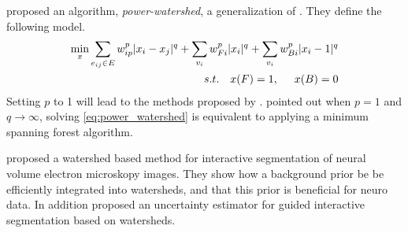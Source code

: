 \citet{couprie_2011_pami} proposed an algorithm, \emph{power-watershed}, a generalization of \citep{RANDOM_WALKER, GRAPH_CUT,WATHERSHEDS,sinop_2007_iccv}.
They define the following model.
\begin{align}\label{eq:power_watershed}
\min_x \sum_{e_{ij} \in E}  w_{ip}^p |x_i-x_j|^q + \sum_{v_i } w_{Fi}^p |x_i|^q + \sum_{v_i } w_{Bi}^p |x_i-1|^q \\
s.t. \hspace{0.35cm} x(F)=1, \hspace{0.5cm} x(B)=0
\end{align}
Setting $p$ to 1 will lead to the methods proposed by \citet{sinop_2007_iccv}.
 pointed out when $p=1$ and $q \rightarrow \infty$, solving
\cref{eq:power_watershed} is equivalent to applying a minimum spanning forest algorithm.




\citet{straehle_2011_miccai} proposed a watershed based method for interactive segmentation
of neural volume electron  microskopy images.
They show how a background prior be be efficiently integrated into watersheds,
and that this prior is beneficial for neuro data.
In addition \citet{straehle_2012_cvpr} proposed an uncertainty estimator for
guided interactive segmentation based on watersheds.
